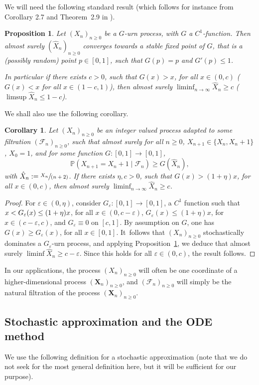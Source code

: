 \documentclass[10pt]{amsart}
\let\mathcal\mathscr
\newcommand{\spfrac}[2]{\sfrac{#1}{(#2)}}
\newcommand{\bX}{\boldsymbol{X}}
\numberwithin{equation}{section}
\newtheorem{corollary}[theorem]{Corollary}
\newtheorem{proposition}[theorem]{Proposition}
\theoremstyle{definition}
\begin{document}
We will need the following standard result (which follows for instance from Corollary 2.7 and Theorem~2.9 in \cite{Pemantle}).
\begin{proposition}\label{lem.urne}
Let $(X_n)_{n\ge 0}$ be a $G$-urn process, with $G$ a $C^1$-function. Then almost surely $(\hat X_n)_{n\ge 0}$ converges towards a stable fixed point
of $G$, that is a (possibly random) point $p\in [0,1]$, such that $G(p)= p$ and $G'(p)\le 1$.

In particular if there exists $c>0$, such that $G(x)>x$, for all $x\in (0,c)$ (\resp $G(x)<x$ for all $x\in (1-c,1)$),
then almost surely $\liminf_{n\to \infty} {\hat X_n}\ge c$ (\resp $\limsup {\hat X_n} \le 1-c$).
\end{proposition}
We shall also use the following corollary.
\begin{corollary}\label{prop.urne}
Let $(X_n)_{n\ge 0}$ be an integer valued process adapted to some filtration $(\mathcal F_n)_{n\ge 0}$, such that almost surely for all $n\ge 0$, $X_{n+1} \in \{X_n,X_n+1\}$, $X_0=1$, and for some function $G:[0,1]\to [0,1]$,
\begin{equation}\label{Gurn.dom}
\mathbb P(X_{n+1} = X_n +1 \mid \mathcal F_n) \ge G(\hat X_n),
\end{equation}
with $\hat X_n :=\spfrac{X_n}{n+2}$.
If there exists $\eta, c>0$, such that $G(x) > (1+\eta)x$, for all $x\in (0,c)$,
then almost surely $\liminf_{n\to \infty} {\hat X_n} \ge c$.
\end{corollary}
\begin{proof} For $\varepsilon \in (0,\eta)$, consider $G_\varepsilon:[0,1] \to [0,1]$, a $C^1$ function such that
$x <\nobreak G_\varepsilon(x) \le (1+\eta)x$, for all $x\in (0,c-\varepsilon)$, $G_\varepsilon(x) \le (1+\eta)x$, for $x\in (c-\varepsilon,c)$, and $G_\varepsilon \equiv 0$ on $[c,1]$. By assumption on $G$,
one has $G(x) \ge G_\varepsilon(x)$, for all $x\in [0,1]$. It~follows that $(X_n)_{n\ge 0}$ stochastically dominates a $G_\varepsilon$-urn process, and
applying {Proposition}~\ref{lem.urne}, we deduce that almost surely $\liminf \hat X_n \ge c-\varepsilon$.
Since this holds for all $\varepsilon \in (0,c)$, the result follows.
\end{proof}
In our applications, the process $(X_n)_{n\ge 0}$ will often be one coordinate of a higher-dimensional process $(\bX_n)_{n\ge 0}$, and
$(\mathcal F_n)_{n\ge 0}$ will simply be the natural filtration of the process $(\bX_n)_{n\ge 0}$.

\subsection{Stochastic approximation and the ODE method}\label{sec.stoch.approx}
We use the following definition for a stochastic approximation (note that we do not seek for the most general definition here, but it will be sufficient for our purpose).
\end{document}
